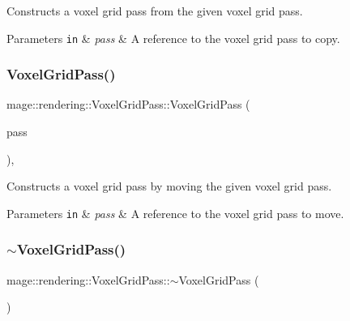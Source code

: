 Constructs a voxel grid pass from the given voxel grid pass.


\begin{DoxyParams}[1]{Parameters}
\mbox{\tt in}  & {\em pass} & A reference to the voxel grid pass to copy. \\
\hline
\end{DoxyParams}
\hypertarget{classmage_1_1rendering_1_1_voxel_grid_pass_a08071670f68b888089b3f945c4ee2dc1}{}\label{classmage_1_1rendering_1_1_voxel_grid_pass_a08071670f68b888089b3f945c4ee2dc1} 
\subsubsection{\texorpdfstring{Voxel\+Grid\+Pass()}{VoxelGridPass()}\hspace{0.1cm}{\footnotesize\ttfamily [3/3]}}
{\footnotesize\ttfamily mage\+::rendering\+::\+Voxel\+Grid\+Pass\+::\+Voxel\+Grid\+Pass (\begin{DoxyParamCaption}\item[{\hyperlink{classmage_1_1rendering_1_1_voxel_grid_pass}{Voxel\+Grid\+Pass} \&\&}]{pass }\end{DoxyParamCaption})\hspace{0.3cm}{\ttfamily [default]}, {\ttfamily [noexcept]}}

Constructs a voxel grid pass by moving the given voxel grid pass.


\begin{DoxyParams}[1]{Parameters}
\mbox{\tt in}  & {\em pass} & A reference to the voxel grid pass to move. \\
\hline
\end{DoxyParams}
\hypertarget{classmage_1_1rendering_1_1_voxel_grid_pass_a64361ec102c8f3f30d1e0d8edac33e5a}{}\label{classmage_1_1rendering_1_1_voxel_grid_pass_a64361ec102c8f3f30d1e0d8edac33e5a} 
\subsubsection{\texorpdfstring{$\sim$\+Voxel\+Grid\+Pass()}{~VoxelGridPass()}}
{\footnotesize\ttfamily mage\+::rendering\+::\+Voxel\+Grid\+Pass\+::$\sim$\+Voxel\+Grid\+Pass (\begin{DoxyParamCaption}{ }\end{DoxyParamCaption})\hspace{0.3cm}{\ttfamily [default]}}


